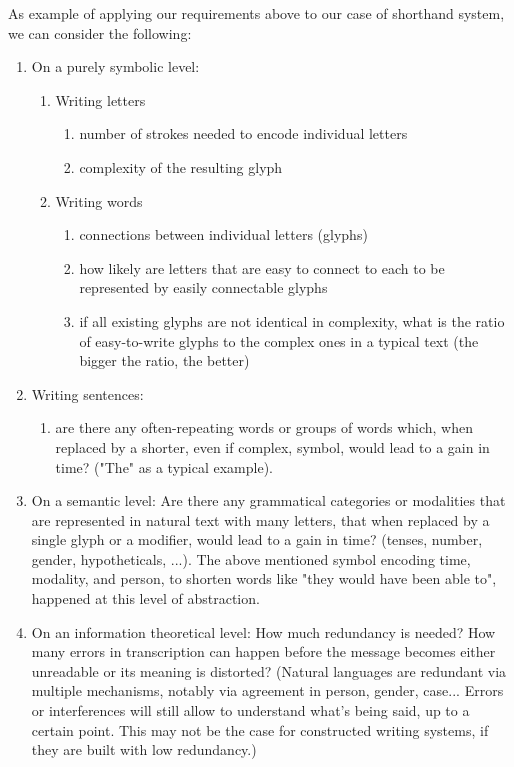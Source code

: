 \documentclass[conference]{IEEEtran}
\begin{document}
As example of applying our requirements above to our case of shorthand system, we can consider the following:
\begin{enumerate}
        \item On a purely symbolic level:
        \begin{enumerate}
                \item Writing letters
                \begin{enumerate}
                        \item number of strokes needed to encode individual letters
                        \item complexity of the resulting glyph
                \end{enumerate}
                \item Writing words
                \begin{enumerate}
                        \item connections between individual letters (glyphs)
                        \item how likely are letters that are easy to connect to each to be represented by easily connectable glyphs
                        \item if all existing glyphs are not identical in complexity, what is the ratio of easy-to-write glyphs to the complex ones in a typical text (the bigger the ratio, the better)
                \end{enumerate}
        \end{enumerate}
        \item Writing sentences:
        \begin{enumerate}
                \item are there any often-repeating words or groups of words which, when replaced by a shorter, even if complex, symbol, would lead to a gain in time? ("The" as a typical example).
        \end{enumerate}
        \item On a semantic level: Are there any grammatical categories or modalities that are represented in natural text with many letters, that when replaced by a single glyph or a modifier, would lead to a gain in time? (tenses, number, gender, hypotheticals, ...). The above mentioned symbol encoding time, modality, and person, to shorten words like "they would have been able to", happened at this level of abstraction.
        \item On an information theoretical level: How much redundancy is needed? How many errors in transcription can happen before the message becomes either unreadable or its meaning is distorted?  (Natural languages  are redundant via multiple mechanisms, notably via agreement in person, gender, case... Errors or interferences will still allow to understand what’s being said, up to a certain point. This may not be the case for constructed writing systems, if they
                are built with low redundancy.)~\cite{reza1961introduction} 
\end{enumerate}
\end{document}
